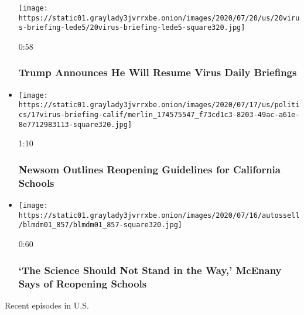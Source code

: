 \begin{itemize}
  \texttt{[image: https://static01.graylady3jvrrxbe.onion/images/2020/07/20/us/20virus-briefing-lede5/20virus-briefing-lede5-square320.jpg]}

  0:58

  \hypertarget{trump-announces-he-will-resume-virus-daily-briefings}{%
  \subsubsection{Trump Announces He Will Resume Virus Daily
  Briefings}\label{trump-announces-he-will-resume-virus-daily-briefings}}
\item
  \href{https://www.nytimes3xbfgragh.onion/video/us/100000007244908/newsom-california-schools.html?action=click\&module=video-series-bar\&region=header\&pgtype=Article\&playlistId=video/u-s}{}

  \texttt{[image: https://static01.graylady3jvrrxbe.onion/images/2020/07/17/us/politics/17virus-briefing-calif/merlin\_174575547\_f73cd1c3-8203-49ac-a61e-8e7712983113-square320.jpg]}

  1:10

  \hypertarget{newsom-outlines-reopening-guidelines-for-california-schools}{%
  \subsubsection{Newsom Outlines Reopening Guidelines for California
  Schools}\label{newsom-outlines-reopening-guidelines-for-california-schools}}
\item
  \href{https://www.nytimes3xbfgragh.onion/video/us/100000007243015/mcenany-trump-coronavirus-schools-science.html?action=click\&module=video-series-bar\&region=header\&pgtype=Article\&playlistId=video/u-s}{}

  \texttt{[image: https://static01.graylady3jvrrxbe.onion/images/2020/07/16/autossell/blmdm01\_857/blmdm01\_857-square320.jpg]}

  0:60

  \hypertarget{the-science-should-not-stand-in-the-way-mcenany-says-of-reopening-schools}{%
  \subsubsection{`The Science Should Not Stand in the Way,' McEnany Says
  of Reopening
  Schools}\label{the-science-should-not-stand-in-the-way-mcenany-says-of-reopening-schools}}
\end{itemize}

Recent episodes in U.S.

